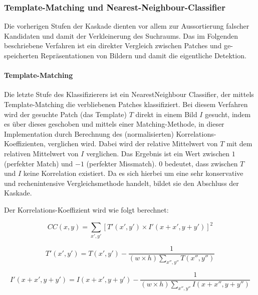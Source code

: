 
	\subsubsection{Template-Matching und Nearest-Neighbour-Classifier}

	Die vorherigen Stufen der Kaskade dienten vor allem zur Aussortierung falscher Kandidaten und damit der Verkleinerung des Suchraums. Das im Folgenden beschriebene Verfahren ist ein direkter Vergleich zwischen Patches und ge-speicherten Repräsentationen von Bildern und damit die eigentliche Detektion.

	\paragraph{Template-Matching}
	Die letzte Stufe des Klassifizierers ist ein NearestNeighbour Classifier, der mittels Template-Matching die verbliebenen Patches klassifiziert. Bei diesem Verfahren wird der gesuchte Patch (das Template) $T$ direkt in einem Bild $I$ gesucht, indem es über dieses geschoben und mittels einer Matching-Methode, in dieser Implementation durch Berechnung des (normalisierten) Korrelations-Koeffizienten, verglichen wird. Dabei wird der relative Mittelwert von $T$ mit dem relativen Mittelwert von $I$ verglichen. Das Ergebnis ist ein Wert zwischen $1$(perfekter Match) und $-1$ (perfekter Missmatch). $0$ bedeutet, dass zwischen $T$ und $I$ keine Korrelation existiert. Da es sich hierbei um eine sehr konservative und rechenintensive Vergleichsmethode handelt, bildet sie den Abschluss der Kaskade.

	Der Korrelations-Koeffizient wird wie folgt berechnet:

	\begin{equation}
	CC(x,y)=\underset{x',y'}{\sum}[T'(x',y')\times I'(x+x',y+y')]^{2}
	\end{equation}


	\begin{equation}
	T'(x',y')=T(x',y')-\frac{1}{(w\times h)\underset{x'',y''}{\sum}T(x'',y'')}
	\end{equation}


	\begin{equation}
	I'(x+x',y+y')=I(x+x',y+y')-\frac{1}{(w\times h)\underset{x'',y''}{\sum}I(x+x'',y+y'')}
	\end{equation}

